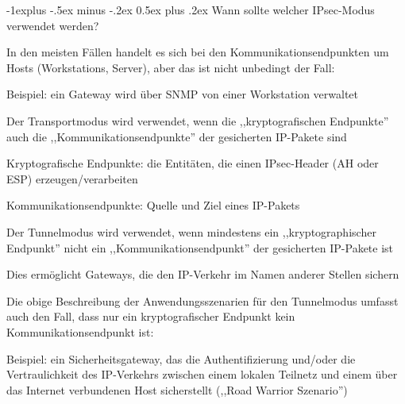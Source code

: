 \documentclass[a4paper]{article}
\makeatletter
\renewcommand{\subsection}{\@startsection{subsection}{2}{0mm}%
 {-1explus -.5ex minus -.2ex}%
 {0.5ex plus .2ex}%
 {\normalfont\normalsize\bfseries}}
\makeatother
\begin{document}
\begin{multicols}{3}
      \subsection{Wann sollte welcher IPsec-Modus verwendet werden?}
      \begin{itemize*}
            \item In den meisten Fällen handelt es sich bei den Kommunikationsendpunkten um Hosts (Workstations, Server), aber das ist nicht unbedingt der Fall:
            \begin{itemize*}
                  \item Beispiel: ein Gateway wird über SNMP von einer Workstation verwaltet
            \end{itemize*}
            \item Der Transportmodus wird verwendet, wenn die ,,kryptografischen Endpunkte'' auch die ,,Kommunikationsendpunkte'' der gesicherten IP-Pakete sind
            \begin{itemize*}
                  \item Kryptografische Endpunkte: die Entitäten, die einen IPsec-Header (AH oder ESP) erzeugen/verarbeiten
                  \item Kommunikationsendpunkte: Quelle und Ziel eines IP-Pakets
            \end{itemize*}
            \item Der Tunnelmodus wird verwendet, wenn mindestens ein ,,kryptographischer Endpunkt'' nicht ein ,,Kommunikationsendpunkt'' der gesicherten IP-Pakete ist
            \begin{itemize*}
                  \item Dies ermöglicht Gateways, die den IP-Verkehr im Namen anderer Stellen sichern
            \end{itemize*}
            \item Die obige Beschreibung der Anwendungsszenarien für den Tunnelmodus umfasst auch den Fall, dass nur ein kryptografischer Endpunkt kein Kommunikationsendpunkt ist:
            \begin{itemize*}
                  \item Beispiel: ein Sicherheitsgateway, das die Authentifizierung und/oder die Vertraulichkeit des IP-Verkehrs zwischen einem lokalen Teilnetz und einem über das Internet verbundenen Host sicherstellt (,,Road Warrior Szenario'')
            \end{itemize*}
      \end{itemize*}


\end{multicols}
\end{document}
